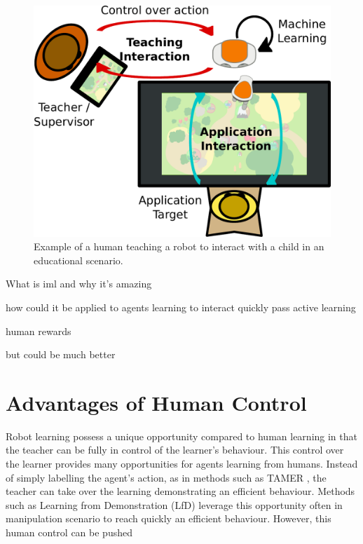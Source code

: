 \documentclass[letterpaper, 10 pt, conference]{ieeeconf}  %
\begin{document}
\begin{figure}[ht]
	\includegraphics[width=.8\linewidth]{setup.pdf}
	\centering
	\caption{Example of a human teaching a robot to interact with a child in an educational scenario.}
	\label{fig:frame}
\end{figure}


What is iml and why it's amazing

how could it be applied to agents learning to interact 
quickly pass active learning 

\cite{fails2003interactive,amershi2014power} 

human rewards

\cite{thomaz2008teachable}
\cite{loftin2016learning}
\cite{macglashan2017interactive}
\cite{munzer2017efficient}
but could be much better
\cite{senft2017supervised} 

\cite{senft2015sparc}

\section{Advantages of Human Control}

Robot learning possess a unique opportunity compared to human learning in that the teacher can be fully in control of the learner's behaviour. This control over the learner provides many opportunities for agents learning from humans. Instead of simply labelling the agent's action, as in methods such as TAMER \cite{knox2009interactively}, the teacher can take over the learning demonstrating an efficient behaviour. Methods such as Learning from Demonstration (LfD) \cite{argall2009survey,billard2008robot} leverage this opportunity often in manipulation scenario to reach quickly an efficient behaviour. However, this human control can be pushed 
\end{document}

